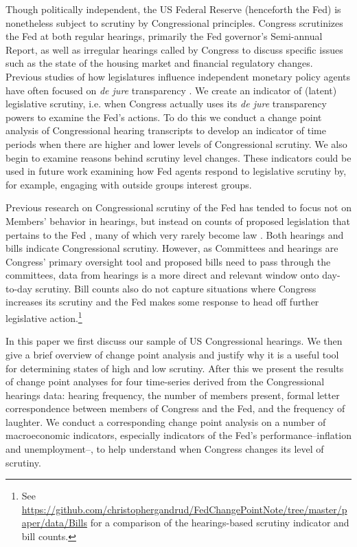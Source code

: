 \documentclass[a4paper]{article}\usepackage[]{graphicx}\usepackage[]{color}
\begin{document}
Though politically independent, the US Federal Reserve (henceforth the Fed) is nonetheless subject to scrutiny by Congressional principles. Congress scrutinizes the Fed at both regular hearings, primarily the Fed governor's Semi-annual Report, as well as irregular hearings called by Congress to discuss specific issues such as the state of the housing market and financial regulatory changes. Previous studies of how legislatures influence independent monetary policy agents have often focused on \emph{de jure} transparency \citep[for example][]{Stasavage2003}. We create an indicator of (latent) legislative scrutiny, i.e. when Congress actually uses its \emph{de jure} transparency powers to examine the Fed's actions. To do this we conduct a change point analysis \citep{SenSrivastava1975, Killick2013, Matteson2014} of Congressional hearing transcripts to develop an indicator of time periods when there are higher and lower levels of Congressional scrutiny. We also begin to examine reasons behind scrutiny level changes. These indicators could be used in future work examining how Fed agents respond to legislative scrutiny by, for example, engaging with outside groups interest groups.

Previous research on Congressional scrutiny of the Fed has tended to focus not on Members' behavior in hearings, but instead on counts of proposed legislation that pertains to the Fed \citep[e.g.][]{Kettl1988}, many of which very rarely become law \citep{Binder2014}. Both hearings and bills indicate Congressional scrutiny. However, as Committees and hearings are Congress' primary oversight tool \citep[][382]{oleszek2013} and proposed bills need to pass through the committees, data from hearings is a more direct and relevant window onto day-to-day scrutiny. Bill counts also do not capture situations where Congress increases its scrutiny and the Fed makes some response to head off further legislative action.\footnote{See \url{https://github.com/christophergandrud/FedChangePointNote/tree/master/paper/data/Bills} for a comparison of the hearings-based scrutiny indicator and bill counts.}

In this paper we first discuss our sample of US Congressional hearings. We then give a brief overview of change point analysis and justify why it is a useful tool for determining states of high and low scrutiny. After this we present the results of change point analyses for four time-series derived from the Congressional hearings data: hearing frequency, the number of members present, formal letter correspondence between members of Congress and the Fed, and the frequency of laughter. We conduct a corresponding change point analysis on a number of macroeconomic indicators, especially indicators of the Fed's performance--inflation and unemployment--, to help understand when Congress changes its level of scrutiny.
\end{document}
